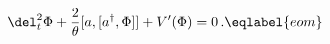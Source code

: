 \begin{equation}
\del_t^2 \Phi +\frac 2\theta [a,[a^\dagger,\Phi]] + V'(\Phi) = 0 \,.
\eqlabel{eom}
\end{equation}


